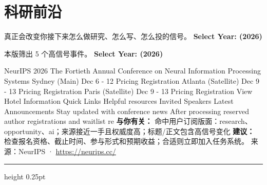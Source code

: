 \documentclass[10.5pt]{ctexart}
\begin{document}
\section*{科研前沿}
{\color{ormuted} 真正会改变你接下来怎么做研究、怎么写、怎么投的信号。}
\vspace{2mm}
{\LARGE\bfseries Select Year: (2026)}\par
\vspace{1mm}
{\color{ormuted} 本版筛出 5 个高信号事件。}
\vspace{3mm}
{\Large\bfseries Select Year: (2026)}\par
NeurIPS 2026 The Fortieth Annual Conference on Neural Information Processing Systems Sydney (Main) Dec 6 - 12 Pricing Registration Atlanta (Satellite) Dec 9 - 13 Pricing Registration Paris (Satellite) Dec 9 - 13 Pricing Registration View Hotel Information Quick Links Helpful resources Invited Speakers Latest Announcements Stay updated with conference news After processing reserved author registrations and waitlist re
\textbf{与你有关：} 命中用户订阅版面：research、opportunity、ai；来源接近一手且权威度高；标题/正文包含高信号变化
\textbf{建议：} 检查报名资格、截止时间、参与形式和预期收益；合适则立即加入任务系统。
{\footnotesize\color{ormuted} 来源：NeurIPS · \url{https://neurips.cc/}}
\vspace{4mm}
\hrule height 0.25pt
\vspace{3mm}
\end{document}
